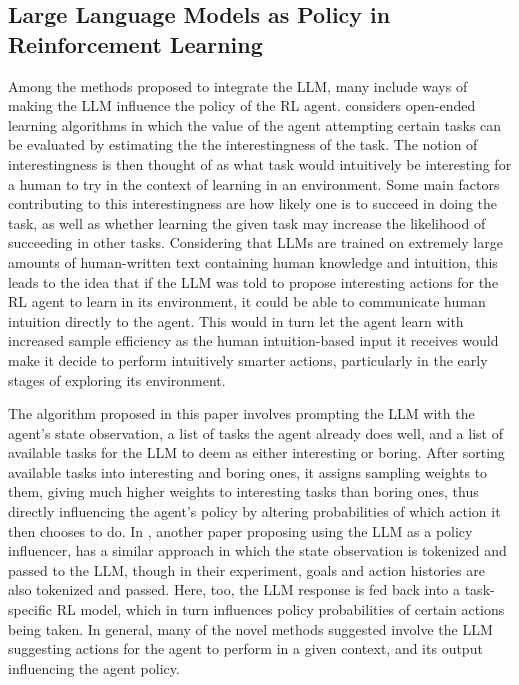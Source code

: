 \documentclass[conference]{IEEEtran}
\begin{document}
\subsection{Large Language Models as Policy in Reinforcement Learning} 

Among the methods proposed to integrate the LLM, many include ways of making the LLM influence the policy of the RL agent. \cite{omni} considers open-ended learning algorithms in which the value of the agent attempting certain tasks can be evaluated by estimating the the interestingness of the task. The notion of interestingness is then thought of as what task would intuitively be interesting for a human to try in the context of learning in an environment. Some main factors contributing to this interestingness are how likely one is to succeed in doing the task, as well as whether learning the given task may increase the likelihood of succeeding in other tasks. Considering that LLMs are trained on extremely large amounts of human-written text containing human knowledge and intuition, this leads to the idea that if the LLM was told to propose interesting actions for the RL agent to learn in its environment, it could be able to communicate human intuition directly to the agent. This would in turn let the agent learn with increased sample efficiency as the human intuition-based input it receives would make it decide to perform intuitively smarter actions, particularly in the early stages of exploring its environment.

The algorithm proposed in this paper involves prompting the LLM with the agent's state observation, a list of tasks the agent already does well, and a list of available tasks for the LLM to deem as either interesting or boring. After sorting available tasks into interesting and boring ones, it assigns sampling weights to them, giving much higher weights to interesting tasks than boring ones, thus directly influencing the agent's policy by altering probabilities of which action it then chooses to do. In \cite{idm}, another paper proposing using the LLM as a policy influencer, has a similar approach in which the state observation is tokenized and passed to the LLM, though in their experiment, goals and action histories are also tokenized and passed. Here, too, the LLM response is fed back into a task-specific RL model, which in turn influences policy probabilities of certain actions being taken. In general, many of the novel methods suggested involve the LLM suggesting actions for the agent to perform in a given context, and its output influencing the agent policy. 
\end{document}
